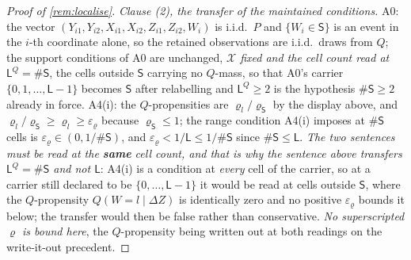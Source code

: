 \begin{proof}[Proof of \cref{rem:localise}]
\emph{Clause \textup{(2)}, the transfer of the maintained conditions.} A0: the vector
$(Y_{i1},Y_{i2},X_{i1},X_{i2},Z_{i1},Z_{i2},W_i)$ is i.i.d.\ $P$ and $\{W_i\in\mathsf S\}$ is an event
in the $i$-th coordinate alone, so the retained observations are i.i.d.\ draws from $Q$; the support
conditions of A0 are unchanged, \emph{$\mathcal X$ fixed and the cell count read at
$\mathsf L^{Q}=\#\mathsf S$}, the cells outside $\mathsf S$ carrying no $Q$-mass, so that A0's carrier
$\{0,1,\dots,\mathsf L-1\}$ becomes $\mathsf S$ after relabelling and $\mathsf L^{Q}\ge2$ is the
hypothesis $\#\mathsf S\ge2$ already in force. A4(i): the $Q$-propensities
are $\varrho_l/\varrho_{\mathsf S}$ by the display above, and
$\varrho_l/\varrho_{\mathsf S}\ge\varrho_l\ge\varepsilon_\varrho$ because
$\varrho_{\mathsf S}\le1$; the range condition A4(i) imposes at $\#\mathsf S$ cells is
$\varepsilon_\varrho\in(0,1/\#\mathsf S)$, and $\varepsilon_\varrho<1/\mathsf L\le1/\#\mathsf S$ since
$\#\mathsf S\le\mathsf L$. \emph{The two sentences must be read at the \textbf{same} cell count, and
that is why the sentence above transfers $\mathsf L^{Q}=\#\mathsf S$ and not $\mathsf L$}: A4(i) is a
condition at \emph{every} cell of the carrier, so at a carrier still declared to be
$\{0,\dots,\mathsf L-1\}$ it would be read at cells outside $\mathsf S$, where the $Q$-propensity
$Q(W=l\mid\Delta Z)$ is identically zero and no positive $\varepsilon_\varrho$ bounds it below; the
transfer would then be false rather than conservative. \emph{No superscripted $\varrho$ is bound here},
the $Q$-propensity being written out at both readings on the write-it-out precedent.

\end{proof}
